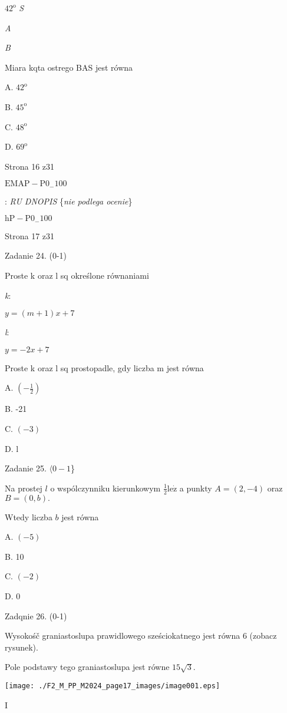 \documentclass[a4paper,12pt]{article}
\begin{document}
$42^{\mathrm{o}}$  {\it S}

{\it A}

{\it B}

Miara kqta ostrego BAS jest równa

A. $42^{\mathrm{o}}$

B. $45^{\mathrm{o}}$

C. $48^{\mathrm{o}}$

D. $69^{\mathrm{o}}$

Strona 16 z31

$\mathrm{E}\mathrm{M}\mathrm{A}\mathrm{P}-\mathrm{P}0_{-}100$





: {\it RU DNOPIS} \{{\it nie podlega ocenie}\}

$\mathrm{h}\mathrm{P}-\mathrm{P}0_{-}100$

Strona 17 z31





Zadanie 24. (0-1)

Proste k oraz l sq określone równaniami

{\it k}:

$y=(m+1)x+7$

{\it l}:

$y=-2x+7$

Proste k oraz l sq prostopadle, gdy liczba m jest równa

A. $(-\displaystyle \frac{1}{2})$

B. -21

C. $(-3)$

D. l

Zadanie 25. $\langle 0-1$\}

Na prostej $l$ o wspólczynniku kierunkowym $\displaystyle \frac{1}{2}\mathrm{l}\mathrm{e}\dot{\mathrm{z}}$ a punkty $A=(2,-4)$ oraz $B=(0,b).$

Wtedy liczba $b$ jest równa

A. $(-5)$

B. 10

C. $(-2)$

D. 0

Zadqnie 26. (0-1)

Wysokośč graniastoslupa prawidlowego sześciokatnego jest równa 6 (zobacz rysunek).

Pole podstawy tego graniastoslupa jest równe $15\sqrt{3}.$
\begin{center}
\texttt{[image: ./F2\_M\_PP\_M2024\_page17\_images/image001.eps]}
\end{center}
I
\end{document}
